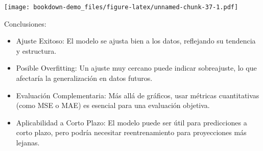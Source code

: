 \documentclass[
]{book}
\newenvironment{Shaded}{\begin{snugshade}}{\end{snugshade}}
\newcommand{\AttributeTok}[1]{\textcolor[rgb]{0.13,0.29,0.53}{#1}}
\newcommand{\CommentTok}[1]{\textcolor[rgb]{0.56,0.35,0.01}{\textit{#1}}}
\newcommand{\DecValTok}[1]{\textcolor[rgb]{0.00,0.00,0.81}{#1}}
\newcommand{\FunctionTok}[1]{\textcolor[rgb]{0.13,0.29,0.53}{\textbf{#1}}}
\newcommand{\NormalTok}[1]{#1}
\newcommand{\OtherTok}[1]{\textcolor[rgb]{0.56,0.35,0.01}{#1}}
\newcommand{\SpecialCharTok}[1]{\textcolor[rgb]{0.81,0.36,0.00}{\textbf{#1}}}
\newcommand{\StringTok}[1]{\textcolor[rgb]{0.31,0.60,0.02}{#1}}
\begin{document}
\begin{Shaded}
\end{Shaded}

\texttt{[image: bookdown-demo\_files/figure-latex/unnamed-chunk-37-1.pdf]}

Conclusiones:

\begin{itemize}
\item
  Ajuste Exitoso: El modelo se ajusta bien a los datos, reflejando su tendencia y estructura.
\item
  Posible Overfitting: Un ajuste muy cercano puede indicar sobreajuste, lo que afectaría la generalización en datos futuros.
\item
  Evaluación Complementaria: Más allá de gráficos, usar métricas cuantitativas (como MSE o MAE) es esencial para una evaluación objetiva.
\item
  Aplicabilidad a Corto Plazo: El modelo puede ser útil para predicciones a corto plazo, pero podría necesitar reentrenamiento para proyecciones más lejanas.
\end{itemize}
\end{document}

